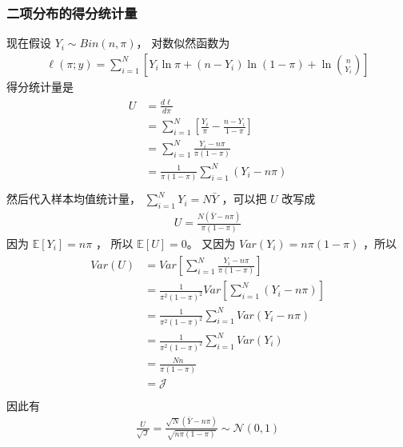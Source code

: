 \documentclass[letterpaper,10pt,english]{sphinxmanual}
\begin{document}
\subsubsection{二项分布的得分统计量}
\label{\detokenize{_u6a21_u578b_u8bc4_u4f30/influence:id3}}
现在假设 \(Y_i \sim Bin(n,\pi)\)，
对数似然函数为
\begin{equation}\label{equation:模型评估/influence:模型评估/influence:15}
\begin{split}\ell(\pi;y) = \sum_{i=1}^N \left [ Y_i \ln \pi +(n-Y_i) \ln (1-\pi) + \ln \binom{n}{Y_i}
\right ]\end{split}
\end{equation}
得分统计量是
\begin{align}\label{equation:模型评估/influence:模型评估/influence:16}\!\begin{aligned}
U &=\frac{d \ell}{d \pi}\\
&=\sum_{i=1}^N \left [ \frac{Y_i}{\pi} - \frac{n-Y_i}{1-\pi} \right ]\\
&= \sum_{i=1}^N  \frac{Y_i-n\pi}{\pi(1-\pi)}\\
&= \frac{1}{\pi(1-\pi)} \sum_{i=1}^N  (Y_i-n\pi)\\
\end{aligned}\end{align}
然后代入样本均值统计量， \(\sum_{i=1}^N Y_i = N\bar{Y}\) ，可以把 \(U\) 改写成
\begin{equation}\label{equation:模型评估/influence:模型评估/influence:17}
\begin{split}U = \frac{ N(\bar{Y} - n\pi)}{\pi(1-\pi)}\end{split}
\end{equation}
因为 \(\mathbb{E}[Y_i]=n\pi\) ，
所以 \(\mathbb{E}[U]=0\)。
又因为 \(Var(Y_i) = n\pi(1-\pi)\)
，所以
\begin{align}\label{equation:模型评估/influence:模型评估/influence:18}\!\begin{aligned}
Var(U)
&=Var\left[     \sum_{i=1}^N  \frac{Y_i-n\pi}{\pi(1-\pi)}      \right ]\\
&= \frac{1}{\pi^2(1-\pi)^2} Var \left [ \sum_{i=1}^N (Y_i-n\pi)      \right]\\
&= \frac{1}{\pi^2(1-\pi)^2} \sum_{i=1}^N Var(Y_i-n\pi)\\
&= \frac{1}{\pi^2(1-\pi)^2} \sum_{i=1}^N Var(Y_i)\\
&= \frac{Nn}{\pi(1-\pi)}\\
&= \mathcal{J}\\
\end{aligned}\end{align}
因此有
\begin{equation}\label{equation:模型评估/influence:模型评估/influence:19}
\begin{split}\frac{U}{\sqrt{J}} = \frac{\sqrt{N}(\bar{Y}-n\pi)}{\sqrt{n\pi(1-\pi)}}
\sim \mathcal{N}(0,1)\end{split}
\end{equation}
\end{document}
